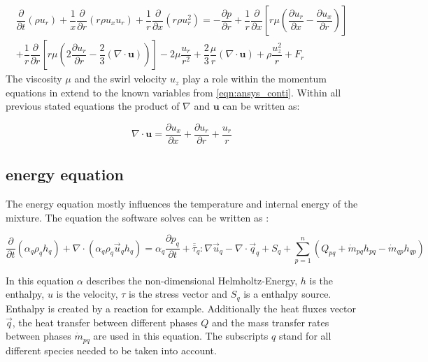 \documentclass[../thesis.tex]{subfiles}
\begin{document}
\begin{gather}
	\dfrac{\partial}{\partial t}(\rho u_r) + \dfrac{1}{x} \dfrac{\partial}{\partial r}(r \rho u_x u_r)
	+ \dfrac{1}{r} \dfrac{\partial}{\partial x}(r \rho u_r^2) = 
	- \dfrac{\partial p}{\partial r} + \dfrac{1}{r} \dfrac{\partial }{\partial x} \left[ 
	r \mu \left( \dfrac{\partial u_r}{\partial x} - \dfrac{\partial u_x}{\partial r} \right)
	\right] \\ \nonumber
	+ \dfrac{1}{r} \dfrac{\partial }{\partial r} \left[ 
	r \mu \left( 2 \dfrac{\partial u_r}{\partial r} - \dfrac{2}{3}(\nabla \cdot \mathbf{u}) \right)
	\right] -
	2 \mu \dfrac{u_r}{r^2}+ \dfrac{2}{3} \dfrac{\mu}{r}(\nabla \cdot \mathbf{u}) + \rho \dfrac{u_z^2}{r} + F_r
\end{gather}
The viscosity $\mu$ and the swirl velocity $u_z$ play a role within the momentum equations in extend to the known variables from \autoref{eqn:ansys_conti}. 
Within all previous stated equations the product of $\nabla$ and $\mathbf{u}$ can be written as:

\begin{equation}
\nabla \cdot \mathbf{u} = \dfrac{\partial u_x}{\partial x} + \dfrac{\partial u_r}{\partial r}+ \dfrac{u_r}{r}
\end{equation}


\subsection{energy equation}

The energy equation mostly influences the temperature and internal energy of the mixture. The equation the software solves can be written as \cite{manual2009ansys}:

\begin{equation} 
\frac{\partial}{\partial t} (\alpha_q \rho_q h_q ) + \nabla \cdot (\alpha_q \rho_q \vec u_q h_q )   = \alpha_q \frac{\partial p_q}{\partial t} + \overline{\overline{\tau}}_q : \nabla \vec u_q - \nabla \cdot \vec q_q + S_q + \sum_{p=1}^n (Q_{pq}  + \dot{m}_{pq} h_{pq} - \dot{m}_{qp} h_{qp}) 
\end{equation}

In this equation $\alpha$ describes the non-dimensional Helmholtz-Energy, $h$ is the enthalpy, $u$ is the velocity, $\tau$ is the stress vector and $S_q$ is a enthalpy source. Enthalpy is created by a reaction for example. Additionally the heat fluxes vector $ \vec q$, the heat transfer between different phases $Q$ and the mass transfer rates between phases $\dot{m}_{pq}$ are used in this equation. The subscripts $q$ stand for all different species needed to be taken into account.
\end{document}
